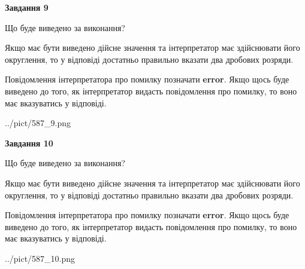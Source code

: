 \documentclass[12pt, ukrainian]{article}
\begin{document}
{\begin {Large}
{\begin {center}\textbf{Завдання 9}\end {center}}\par
Що буде виведено за виконання? \par

Якщо має бути виведено дійсне значення та інтерпретатор має здійснювати його округлення, 
то у відповіді достатньо правильно вказати два дробових розряди.

Повідомлення інтерпретатора про помилку позначати \textbf{error}.
Якщо щось буде виведено до того, як інтерпретатор видасть повідомлення про помилку, 
то воно має вказуватись у відповіді. \par

\begin{center}
	{../pict/587_9.png}
\end{center}
\newpage

{\begin {center}\textbf{Завдання 10}\end {center}}\par
Що буде виведено за виконання? \par

Якщо має бути виведено дійсне значення та інтерпретатор має здійснювати його округлення, 
то у відповіді достатньо правильно вказати два дробових розряди.

Повідомлення інтерпретатора про помилку позначати \textbf{error}.
Якщо щось буде виведено до того, як інтерпретатор видасть повідомлення про помилку, 
то воно має вказуватись у відповіді. \par

\begin{center}
	{../pict/587_10.png}
\end{center}
\newpage

\end {Large}}
\end{document}
